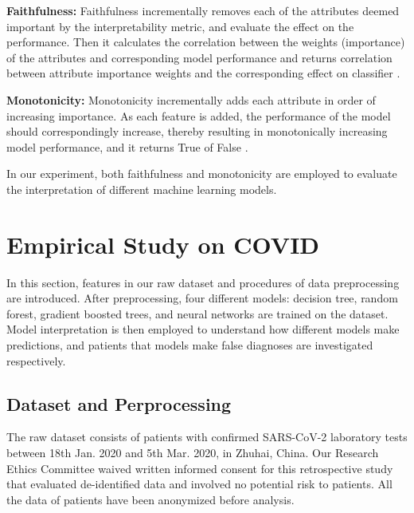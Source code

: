
\textbf{Faithfulness:} Faithfulness incrementally removes each of the attributes deemed important by the interpretability metric, and evaluate the effect on the performance. Then it calculates the correlation between the weights (importance) of the attributes and corresponding model performance and returns correlation between attribute importance weights and the corresponding effect on classifier \cite{alvarezmelis2018robust}.

\textbf{Monotonicity:} Monotonicity incrementally adds each attribute in order of increasing importance. As each feature is added, the performance of the model should correspondingly increase, thereby resulting in monotonically increasing model performance, and it returns True of False \cite{luss2019generating}.
\color{black}

In our experiment, both faithfulness and monotonicity are employed to evaluate the interpretation of different machine learning models. 

\section{Empirical Study on COVID}

In this section, features in our raw dataset and procedures of data preprocessing are introduced. After preprocessing, four different models: decision tree, random forest, gradient boosted trees, and neural networks are trained on the dataset. Model interpretation is then employed to understand how different models make predictions, and patients that models make false diagnoses are investigated respectively.

\subsection{\textbf{Dataset and Perprocessing}}

The raw dataset consists of patients with confirmed SARS-CoV-2 laboratory tests between 18th Jan. 2020 and 5th Mar. 2020, in Zhuhai, China. Our Research Ethics Committee waived written informed consent for this retrospective study that evaluated de-identified data and involved no potential risk to patients. All the data of patients have been anonymized before analysis.

